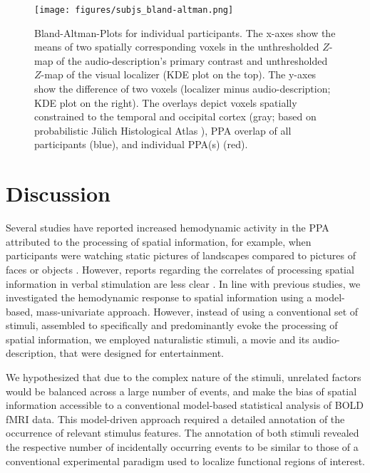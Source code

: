 \documentclass[english,11pt]{article}
\begin{document}
\begin{figure*}[tbp]
\centering
    \texttt{[image: figures/subjs\_bland-altman.png]}
    \caption{Bland-Altman-Plots for individual participants.
    The x-axes show the means of two spatially corresponding voxels in the
    unthresholded $Z$-map of the audio-description's primary contrast and
    unthresholded $Z$-map of the visual localizer (KDE plot on the top).
    The y-axes show the difference of two voxels (localizer minus
    audio-description; KDE plot on the right).
    The overlays depict voxels spatially constrained to the
    temporal and occipital cortex (gray; based on probabilistic Jülich
    Histological Atlas \citep{eickhoff2005toolbox, eickhoff2007assignment}),
    PPA overlap of all participants (blue),
    and individual PPA(s) (red).}
    \label{fig:bland-altman}
\end{figure*}


\section*{Discussion}




Several studies have reported increased hemodynamic activity in the PPA
attributed to the processing of spatial information, for example, when
participants were watching static pictures of landscapes compared to pictures of
faces or objects \citep{epstein1998ppa, epstein1999parahippocampal}.
However, reports regarding the correlates of processing spatial information in
verbal stimulation are less clear \citep{aziz2008modulation}.
In line with previous studies, we investigated the hemodynamic response to
spatial information using a model-based, mass-univariate approach.
However, instead of using a conventional set of stimuli, assembled to
specifically and predominantly evoke the processing of spatial information, we
employed naturalistic stimuli, a movie and its audio-description, that were
designed for entertainment.

We hypothesized that due to the complex nature of the stimuli, unrelated factors
would be balanced across a large number of events, and make the bias of spatial
information accessible to a conventional model-based statistical analysis of BOLD
fMRI data.
This model-driven approach required a detailed annotation of the occurrence of
relevant stimulus features.
The annotation of both stimuli revealed the respective number of incidentally
occurring events to be similar to those of a conventional experimental paradigm
used to localize functional regions of interest.
\end{document}
